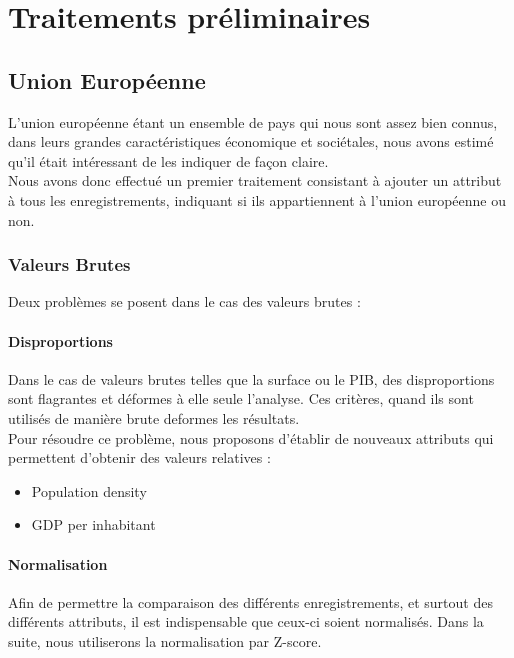 \section{Traitements préliminaires}

\subsection{Union Européenne}
L'union européenne étant un ensemble de pays qui nous sont assez bien connus, dans leurs grandes caractéristiques économique et sociétales, nous avons estimé qu'il était intéressant de les indiquer de façon claire.\\
Nous avons donc effectué un premier traitement consistant à ajouter un attribut à tous les enregistrements, indiquant si ils appartiennent à l'union européenne ou non.\\

\subsubsection{Valeurs Brutes}
Deux problèmes se posent dans le cas des valeurs brutes : 
\paragraph{Disproportions} Dans le cas de valeurs brutes telles que la surface ou le PIB, des disproportions sont flagrantes et déformes à elle seule l'analyse. Ces critères, quand ils sont utilisés de manière brute deformes les résultats.\\
Pour résoudre ce problème, nous proposons d'établir de nouveaux attributs qui permettent d'obtenir des valeurs relatives : 
\begin{itemize}
	\item Population density 
	\item GDP per inhabitant
\end{itemize}

\paragraph{Normalisation}
Afin de permettre la comparaison des différents enregistrements, et surtout des différents attributs, il est indispensable que ceux-ci soient normalisés.
Dans la suite, nous utiliserons la normalisation par Z-score.







